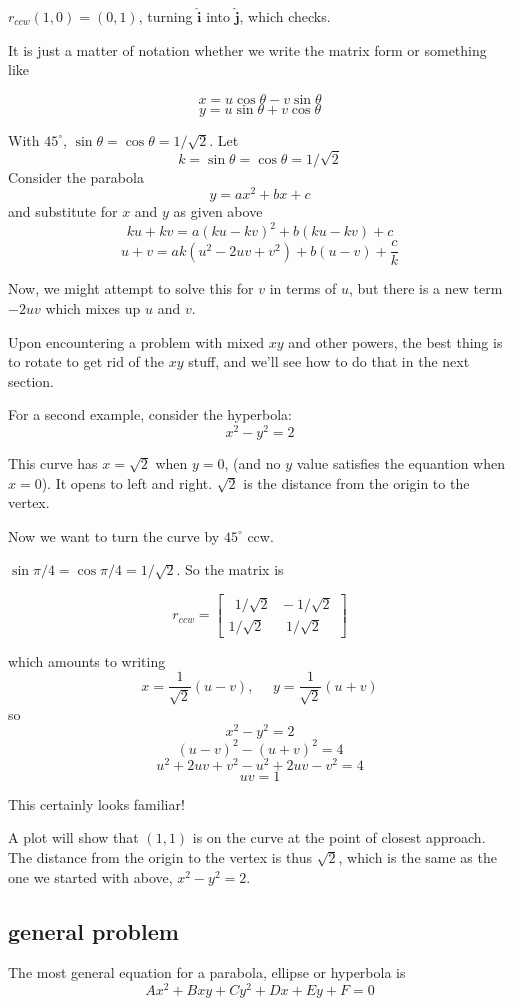 \documentclass[11pt, oneside]{article}
\begin{document}
$r_{ccw} (1,0) = (0,1)$, turning $\mathbf{\hat{i}}$ into $\mathbf{\hat{j}}$, which checks.

It is just a matter of notation whether we write the matrix form or something like

\[ x = u \cos \theta - v \sin \theta \]
\[ y = u \sin \theta + v \cos \theta \]

With $45^\circ$, $\sin \theta = \cos \theta = 1/ \sqrt{2}$.
Let
\[ k = \sin \theta = \cos \theta = 1/ \sqrt{2} \]
Consider the parabola
\[ y = ax^2 + bx + c \]
and substitute for $x$ and $y$ as given above
\[ ku + kv = a(ku - kv)^2 + b(ku - kv) + c \]
\[ u + v = ak(u^2 - 2uv + v^2) + b(u - v) + \frac{c}{k} \]

Now, we might attempt to solve this for $v$ in terms of $u$, but there is a new term $-2uv$ which mixes up $u$ and $v$.

Upon encountering a problem with mixed $xy$ and other powers, the best thing is to rotate to get rid of the $xy$ stuff, and we'll see how to do that in the next section.

For a second example, consider the hyperbola:
\[ x^2 - y^2 = 2 \]

This curve has $x = \sqrt{2}$ when $y = 0$, (and no $y$ value satisfies the equantion when $x = 0$).  It opens to left and right.  $\sqrt{2}$ is the distance from the origin to the vertex.

Now we want to turn the curve by $45^\circ$ ccw.  

$\sin \pi/4 = \cos \pi/4 = 1/ \sqrt{2}$.  So the matrix is

\[ r_{ccw} = 
\begin{bmatrix}
\ \ 1/\sqrt{2} \ \  \ -1/\sqrt{2} \\
1/\sqrt{2} \ \ \ \ \ \ \ 1/\sqrt{2} 
\end{bmatrix}
\]

which amounts to writing
\[ x = \frac{1}{\sqrt{2}} (u - v), \ \ \ \ \ \ y = \frac{1}{\sqrt{2}} (u + v) \]
so
\[ x^2 - y^2 = 2 \]
\[ (u - v)^2 - (u + v)^2 = 4 \]
\[ u^2 + 2uv + v^2 - u^2 + 2uv - v^2 = 4 \]
\[ uv = 1 \]

This certainly looks familiar!

A plot will show that $(1,1)$ is on the curve at the point of closest approach.  The distance from the origin to the vertex is thus $\sqrt{2}$, which is the same as the one we started with above, $x^2 - y^2 = 2$.

\subsection*{general problem}
The most general equation for a parabola, ellipse or hyperbola is
\[ Ax^2 + Bxy + Cy^2 + Dx + Ey + F = 0 \]
\end{document}
